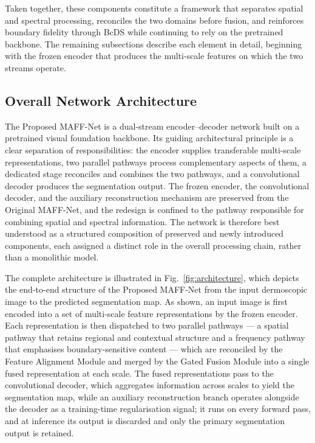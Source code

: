 Taken together, these components constitute a framework that separates spatial and spectral processing, reconciles the two domains before fusion, and reinforces boundary fidelity through BcDS while continuing to rely on the pretrained backbone. The remaining subsections describe each element in detail, beginning with the frozen encoder that produces the multi-scale features on which the two streams operate.

\subsection{Overall Network Architecture}

The Proposed MAFF-Net is a dual-stream encoder--decoder network built on a pretrained visual foundation backbone. Its guiding architectural principle is a clear separation of responsibilities: the encoder supplies transferable multi-scale representations, two parallel pathways process complementary aspects of them, a dedicated stage reconciles and combines the two pathways, and a convolutional decoder produces the segmentation output. The frozen encoder, the convolutional decoder, and the auxiliary reconstruction mechanism are preserved from the Original MAFF-Net, and the redesign is confined to the pathway responsible for combining spatial and spectral information. The network is therefore best understood as a structured composition of preserved and newly introduced components, each assigned a distinct role in the overall processing chain, rather than a monolithic model.

The complete architecture is illustrated in Fig.~\ref{fig:architecture}, which depicts the end-to-end structure of the Proposed MAFF-Net from the input dermoscopic image to the predicted segmentation map. As shown, an input image is first encoded into a set of multi-scale feature representations by the frozen encoder. Each representation is then dispatched to two parallel pathways --- a spatial pathway that retains regional and contextual structure and a frequency pathway that emphasises boundary-sensitive content --- which are reconciled by the Feature Alignment Module and merged by the Gated Fusion Module into a single fused representation at each scale. The fused representations pass to the convolutional decoder, which aggregates information across scales to yield the segmentation map, while an auxiliary reconstruction branch operates alongside the decoder as a training-time regularisation signal; it runs on every forward pass, and at inference its output is discarded and only the primary segmentation output is retained.

